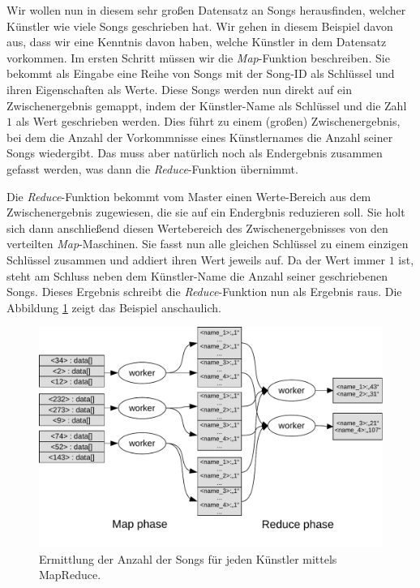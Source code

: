 Wir wollen nun in diesem sehr großen Datensatz an Songs herausfinden, welcher Künstler wie viele Songs geschrieben hat. Wir gehen in diesem Beispiel davon aus, dass wir eine Kenntnis davon haben, welche Künstler in  dem Datensatz vorkommen.
Im ersten Schritt müssen wir die \textit{Map}-Funktion beschreiben. Sie bekommt als Eingabe eine Reihe von Songs mit der Song-ID
als Schlüssel und ihren Eigenschaften als Werte. Diese Songs werden nun direkt auf ein Zwischenergebnis gemappt, indem der
Künstler-Name als Schlüssel und die Zahl $1$ als Wert geschrieben werden. Dies führt zu einem (großen) Zwischenergebnis,
bei dem die Anzahl der Vorkommnisse eines Künstlernames die Anzahl seiner Songs wiedergibt. Das muss aber
natürlich noch als Endergebnis zusammen gefasst werden, was dann die \textit{Reduce}-Funktion übernimmt. 

Die \textit{Reduce}-Funktion bekommt vom Master einen Werte-Bereich aus dem Zwischenergebnis zugewiesen, die sie auf
ein Endergbnis reduzieren soll. Sie holt sich dann anschließend diesen Wertebereich des Zwischenergebnisses von den verteilten
\textit{Map}-Maschinen. Sie fasst nun alle gleichen Schlüssel zu einem einzigen Schlüssel zusammen und addiert 
ihren Wert jeweils auf. Da der Wert immer $1$ ist, steht am Schluss neben dem Künstler-Name die Anzahl seiner geschriebenen
Songs. Dieses Ergebnis schreibt die  \textit{Reduce}-Funktion nun als Ergebnis raus. Die Abbildung \ref{fig:mapreduceExample} zeigt 
das Beispiel anschaulich.

\begin{figure}[H]
\centering
\includegraphics[width=1.0\textwidth]{images/06mapreduceExample.pdf}
\caption{Ermittlung der Anzahl der Songs für jeden Künstler mittels MapReduce.}
\label{fig:mapreduceExample}
\end{figure}

%

